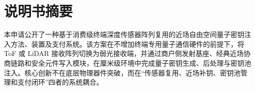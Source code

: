 ﻿\documentclass[12pt,a4paper]{article}
\begin{document}
\section{说明书摘要}
本申请公开了一种基于消费级终端深度传感器阵列复用的近场自由空间量子密钥注入方法、装置及支付系统。该方案在不增加终端专用量子通信硬件的前提下，将 ToF 或 LiDAR 接收阵列切换为弱光接收端，并通过商户侧发射基座、经典近场协商链路和安全元件写入模块，在厘米级环境中完成量子密钥生成、后处理与密钥池注入。核心创新不在底层物理器件突破，而在“传感器复用、近场补钥、密钥池管理和支付闭环”四者的系统耦合。
\end{document}
